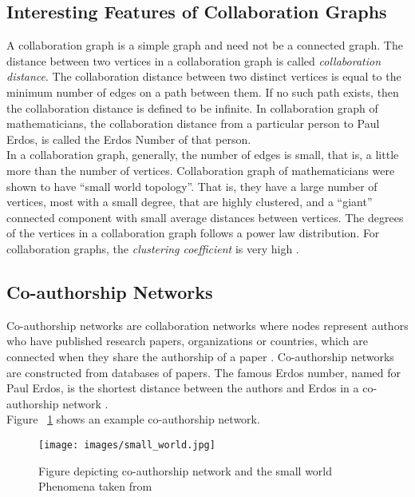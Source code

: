 \documentclass[12pt]{article}
\theoremstyle{definition}
\begin{document}
\subsection{Interesting Features of Collaboration Graphs}
A collaboration graph is a simple graph and need not be a connected graph. The distance between two vertices in a collaboration graph is called \textit{collaboration distance}. The collaboration distance between two distinct vertices is equal to the minimum number of edges on a path between them. If no such path exists, then the collaboration distance is defined to be infinite. In collaboration graph of mathematicians, the collaboration distance from a particular person to Paul Erdos, is called the Erdos Number of that person\cite{yegnanarayanan2011note}. \\
In a collaboration graph, generally, the number of edges is small, that is, a little more than the number of vertices. Collaboration graph of mathematicians were shown to have “small world topology”. That is, they have a large number of vertices, most with a small degree, that are highly clustered, and a “giant” connected component with small average distances between vertices. The degrees of the vertices in a collaboration graph follows a power law distribution. For collaboration graphs, the \textit{clustering coefficient} is very high \cite{yegnanarayanan2011note}.

\subsection{Co-authorship Networks}
Co-authorship networks are collaboration networks where nodes represent authors who have published research papers, organizations or countries, which are connected when they share the authorship of a paper \cite{e2016co}. Co-authorship networks are constructed from databases of papers. The famous Erdos number, named for Paul Erdos, is the shortest distance between the authors and Erdos in a co-authorship network \cite{zhou2017model}. \\Figure ~\ref{fig2} shows an example co-authorship network. 
\begin{figure}
 \noindent
\centering
\texttt{[image: images/small\_world.jpg]}
 \caption{Figure depicting co-authorship network and the small world Phenomena taken from \cite{kumar2015co}} \label{fig2}
\end{figure}
\end{document}
